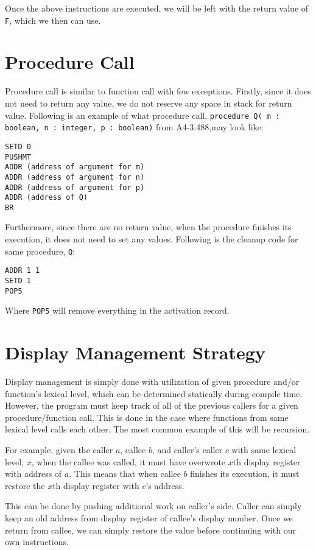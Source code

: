 \documentclass{article}
\begin{document}
Once the above instructions are executed, we will be left with the return value of {\tt F}, which we then can use.

\section{Procedure Call}

Procedure call is similar to function call with few exceptions. Firstly, since it does not need to return any value, we do not reserve any space in stack for return value. Following is an example of what procedure call, {\tt procedure Q( m : boolean, n : integer, p : boolean)} from A4-3.488,may look like:

\begin{lstlisting}
SETD 0
PUSHMT
ADDR (address of argument for m)
ADDR (address of argument for n)
ADDR (address of argument for p)
ADDR (address of Q)
BR
\end{lstlisting}

Furthermore, since there are no return value, when the procedure finishes its execution, it does not need to set any values. Following is the cleanup code for same procedure, {\tt Q}:

\begin{lstlisting}
ADDR 1 1
SETD 1
POP5
\end{lstlisting}

Where {\tt POP5} will remove everything in the activation record.

\section{Display Management Strategy} \label{display}

Display management is simply done with utilization of given procedure and/or function's lexical level, which can be determined statically during compile time. However, the program must keep track of all of the previous callers for a given procedure/function call. This is done in the case where functions from same lexical level calls each other. The most common example of this will be recursion.

For example, given the caller $a$, callee $b$, and caller's caller $c$ with same lexical level, $x$, when the callee was called, it must have overwrote $x$th display register with address of $a$. This means that when callee $b$ finishes its execution, it must restore the $x$th display register with $c$'s address.

This can be done by pushing additional work on caller's side. Caller can simply keep an old address from display register of callee's display number. Once we return from callee, we can simply restore the value before continuing with our own instructions.
\end{document}
